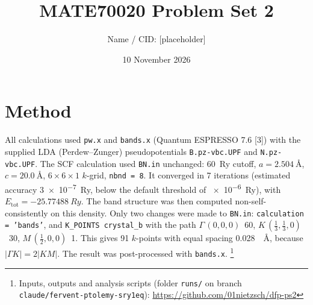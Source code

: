 \documentclass[11pt,a4paper]{article}
\title{\vspace{-1.3cm}MATE70020 Problem Set 2}
\author{Name / CID: [placeholder]}
\date{10 November 2026}
\begin{document}
\maketitle
\vspace{-0.9cm}

\noindent{}

\section*{Method}
All calculations used \texttt{pw.x} and \texttt{bands.x} (Quantum ESPRESSO 7.6 [3]) with the supplied LDA
(Perdew--Zunger) pseudopotentials \texttt{B.pz-vbc.UPF} and \texttt{N.pz-vbc.UPF}. The SCF calculation used
\texttt{BN.in} unchanged: \SI{60}{Ry} cutoff, $a=\SI{2.504}{\angstrom}$, $c=\SI{20.0}{\angstrom}$,
$6\times6\times1$ $k$-grid, \texttt{nbnd = 8}. It converged in 7 iterations (estimated accuracy
\SI{3e-7}{Ry}, below the default threshold of \SI{e-6}{Ry}), with $E_\text{tot}=\SI{-25.77488}{Ry}$.
The band structure was then computed non-self-consistently on this density. Only two changes were made to \texttt{BN.in}:
\texttt{calculation = 'bands'}, and \texttt{K\_POINTS crystal\_b} with the path
$\Gamma\,(0,0,0)$~60, $K\,(\tfrac13,\tfrac13,0)$~30, $M\,(\tfrac12,0,0)$~1. This gives 91 $k$-points with
equal spacing \SI{0.028}{\per\angstrom}, because $|\Gamma K|=2|KM|$. The result was post-processed with \texttt{bands.x}.%
\footnote{Inputs, outputs and analysis scripts (folder \texttt{runs/} on branch
\texttt{claude/fervent-ptolemy-sry1eq}): \url{https://github.com/01nietzsch/dfp-ps2}}
\end{document}
